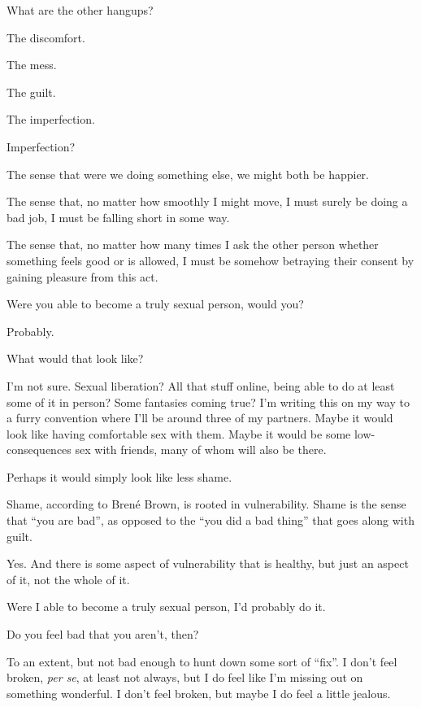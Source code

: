 \begin{paracol}{2}
\begin{leftcolumn}
\begin{ally}
What are the other hangups?
\end{ally}
The discomfort.

The mess.

The guilt.

The imperfection.

\begin{ally}
Imperfection?
\end{ally}
The sense that were we doing something else, we might both be happier.

The sense that, no matter how smoothly I might move, I must surely be doing a bad job, I must be falling short in some way.

The sense that, no matter how many times I ask the other person whether something feels good or is allowed, I must be somehow betraying their consent by gaining pleasure from this act.
\newpage

\begin{ally}
Were you able to become a truly sexual person, would you?
\end{ally}
Probably.

\begin{ally}
What would that look like?
\end{ally}
I'm not sure. Sexual liberation? All that stuff online, being able to do at least some of it in person? Some fantasies coming true? I'm writing this on my way to a furry convention where I'll be around three of my partners. Maybe it would look like having comfortable sex with them. Maybe it would be some low-consequences sex with friends, many of whom will also be there.

Perhaps it would simply look like less shame.

\begin{ally}
Shame, according to Brené Brown, is rooted in vulnerability. Shame is the sense that ``you are bad'', as opposed to the ``you did a bad thing'' that goes along with guilt.
\end{ally}
Yes. And there is some aspect of vulnerability that is healthy, but just an aspect of it, not the whole of it.

Were I able to become a truly sexual person, I'd probably do it.

\begin{ally}
Do you feel bad that you aren't, then?
\end{ally}
To an extent, but not bad enough to hunt down some sort of ``fix''. I don't feel broken, \emph{per se}, at least not always, but I do feel like I'm missing out on something wonderful. I don't feel broken, but maybe I do feel a little jealous.
\newpage


\end{leftcolumn}
\end{paracol}
